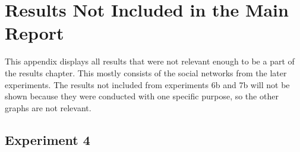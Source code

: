 \chapter{Results Not Included in the Main Report}\label{AppendixA}
This appendix displays all results that were not relevant enough to be a part of the results chapter. This mostly consists of the social networks from the later experiments. The results not included from experiments 6b and 7b will not be shown because they were conducted with one specific purpose, so the other graphs are not relevant.

\clearpage
\section{Experiment 4}

